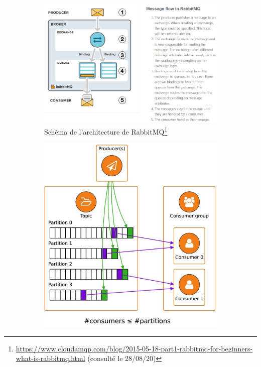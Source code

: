 \documentclass[11pt]{article}
\begin{document}
			\medskip
			\begin{figure}
				\begin{subfigure}{0.6\textwidth}
					\hspace*{-2cm}
					\includegraphics[scale=0.5]{../include/RabbitMQ.PNG}
					\caption{Schéma de l'architecture de RabbitMQ\footnote{\href{https://www.cloudamqp.com/blog/2015-05-18-part1-rabbitmq-for-beginners-what-is-rabbitmq.html}{https://www.cloudamqp.com/blog/2015-05-18-part1-rabbitmq-for-beginners-what-is-rabbitmq.html} (consulté le 28/08/20)}}
					\label{fig:archirabbitmq}
				\end{subfigure}
				\begin{subfigure}{0.5\textwidth}
					\includegraphics[scale=0.55]{../include/Kafka.PNG}

\end{subfigure}
\end{figure}
\end{document}
